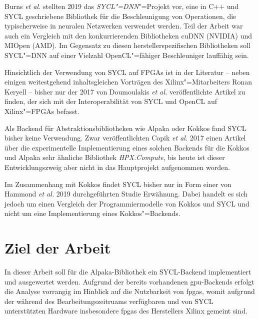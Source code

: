 Burns \textit{et al.} stellten 2019 das \textit{SYCL"=DNN}"=Projekt vor, eine in
C++ und SYCL geschriebene Bibliothek für die Beschleunigung von Operationen, die
typischerweise in neuralen Netzwerken verwendet werden. Teil der Arbeit war auch
ein Vergleich mit den konkurrierenden Bibliotheken cuDNN (NVIDIA) und
MIOpen (AMD). Im Gegensatz zu diesen herstellerspezifischen Bibliotheken soll
SYCL"=DNN auf einer Vielzahl OpenCL"=fähiger Beschleuniger lauffähig sein.
\cite[vgl.][]{burns2019}

Hinsichtlich der Verwendung von SYCL auf FPGAs ist in der Literatur -- neben
einigen weitestgehend inhaltsgleichen Vorträgen des Xilinx"=Mitarbeiters Ronan
Keryell -- bisher nur der 2017 von Doumoulakis \textit{et al.} veröffentlichte
Artikel zu finden, der sich mit der Interoperabilität von SYCL und OpenCL auf
Xilinx"=FPGAs befasst.
\cite[vgl.][]{doumoulakis2017}

Als Backend für Abstraktionsbibliotheken wie Alpaka oder Kokkos fand SYCL bisher
keine Verwendung. Zwar veröffentlichten Copik \textit{et al.} 2017 einen Artikel
über die experimentelle Implementierung eines solchen Backends für die Kokkos
und Alpaka sehr ähnliche Bibliothek \textit{HPX.Compute}, bis heute ist dieser
Entwicklungszweig aber nicht in das Hauptprojekt aufgenommen worden.
\cite[vgl.][]{copik2017}

Im Zusammenhang mit Kokkos findet SYCL bisher nur in Form einer von Hammond
\textit{et al.} 2019 durchgeführten Studie Erwähnung. Dabei handelt es sich
jedoch um einen Vergleich der Programmiermodelle von Kokkos und SYCL und nicht
um eine Implementierung eines Kokkos"=Backends.
\cite[vgl.][]{hammond2019}

\section{Ziel der Arbeit}\label{einleitung:ziel}

In dieser Arbeit soll für die Alpaka-Bibliothek ein SYCL-Backend implementiert
und ausgewertet werden. Aufgrund der bereits vorhandenen \gls{gpu}-Backends
erfolgt die Analyse vorrangig im Hinblick auf die Nutzbarkeit von \gls{fpga}s,
womit aufgrund der während des Bearbeitungszeitruams verfügbaren und von SYCL
unterstützten Hardware insbesondere \gls{fpga}s des Herstellers Xilinx gemeint
sind.
